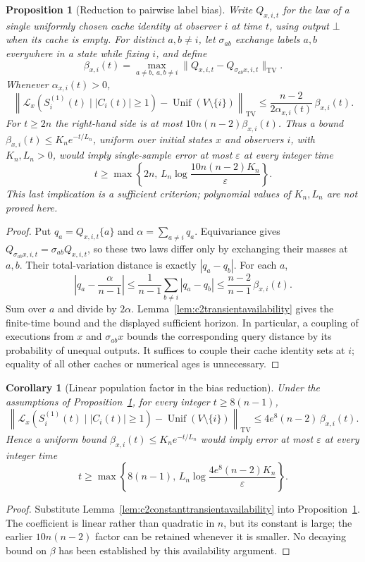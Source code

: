 \documentclass[11pt]{article}
\newtheorem{proposition}[theorem]{Proposition}
\newtheorem{corollary}[theorem]{Corollary}
\newcommand{\TV}{\mathrm{TV}}
\newcommand{\Unif}{\operatorname{Unif}}
\newcommand{\Law}{\mathcal L}
\begin{document}
\begin{proposition}[Reduction to pairwise label bias]
\label{prop:c2localcouplingtarget}
Write $Q_{x,i,t}$ for the law of a single uniformly chosen
cache identity at observer $i$ at time $t$, using output
$\bot$ when its cache is empty. For distinct $a,b\ne i$,
let $\sigma_{ab}$ exchange labels $a,b$ everywhere in a
state while fixing $i$, and define
\[
 \beta_{x,i}(t)=\max_{a\ne b,\ a,b\ne i}
 \|Q_{x,i,t}-Q_{\sigma_{ab}x,i,t}\|_{\TV}.
\]
Whenever $\alpha_{x,i}(t)>0$,
\[
 \left\|\Law_x(S_i^{(1)}(t)\mid |C_i(t)|\ge1)
       -\Unif(V\setminus\{i\})\right\|_{\TV}
 \le\frac{n-2}{2\alpha_{x,i}(t)}\,\beta_{x,i}(t).
\]
For $t\ge2n$ the right-hand side is at most
$10n(n-2)\beta_{x,i}(t)$.
Thus a bound $\beta_{x,i}(t)\le K_n e^{-t/L_n}$,
uniform over initial states $x$ and observers $i$, with
$K_n,L_n>0$, would imply single-sample error at most $\varepsilon$
at every integer time
\[
 t\ge\max\!\left\{2n,\,
 L_n\log\!\frac{10n(n-2)K_n}{\varepsilon}\right\}.
\]
This last implication is a sufficient criterion;
polynomial values of $K_n,L_n$ are not proved here.
\end{proposition}
\begin{proof}
Put $q_a=Q_{x,i,t}\{a\}$ and
$\alpha=\sum_{a\ne i}q_a$. Equivariance gives
$Q_{\sigma_{ab}x,i,t}=\sigma_{ab}Q_{x,i,t}$,
so these two laws differ only by exchanging their masses
at $a,b$. Their total-variation distance is exactly
$|q_a-q_b|$. For each $a$,
\[
 \left|q_a-\frac\alpha{n-1}\right|
 \le\frac1{n-1}\sum_{b\ne i}|q_a-q_b|
 \le\frac{n-2}{n-1}\,\beta_{x,i}(t).
\]
Sum over $a$ and divide by $2\alpha$.
Lemma~\ref{lem:c2transientavailability} gives the
finite-time bound and the displayed sufficient horizon.
In particular, a coupling of executions from $x$ and
$\sigma_{ab}x$ bounds the corresponding query distance
by its probability of unequal outputs. It suffices to
couple their cache identity sets at $i$; equality of all
other caches or numerical ages is unnecessary.
\end{proof}


\begin{corollary}[Linear population factor in the bias reduction]
\label{cor:c2linearconditioningfactor}
Under the assumptions of Proposition~\ref{prop:c2localcouplingtarget},
for every integer $t\ge8(n-1)$,
\[
 \left\|\Law_x(S_i^{(1)}(t)\mid |C_i(t)|\ge1)
       -\Unif(V\setminus\{i\})\right\|_{\TV}
 \le4e^8(n-2)\,\beta_{x,i}(t).
\]
Hence a uniform bound $\beta_{x,i}(t)\le K_n e^{-t/L_n}$
would imply error at most $\varepsilon$ at every integer time
\[
 t\ge\max\!\left\{8(n-1),\,
 L_n\log\!\frac{4e^8(n-2)K_n}{\varepsilon}\right\}.
\]
\end{corollary}
\begin{proof}
Substitute Lemma~\ref{lem:c2constanttransientavailability}
into Proposition~\ref{prop:c2localcouplingtarget}.
The coefficient is linear rather than quadratic in $n$,
but its constant is large; the earlier $10n(n-2)$ factor
can be retained whenever it is smaller. No decaying bound
on $\beta$ has been established by this availability argument.
\end{proof}
\end{document}

